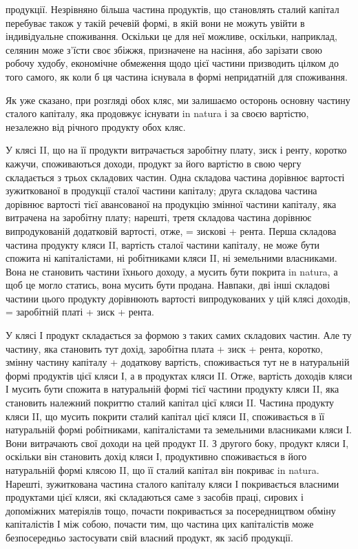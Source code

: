 \parcont{}  %
продукції. Незрівняно більша частина продуктів, що становлять сталий капітал
перебуває також у такій речевій формі, в якій вони не можуть увійти
в індивідуальне споживання. Оскільки це для неї можливе, оскільки, наприклад,
селянин може з’їсти своє збіжжя, призначене на насіння, або зарізати свою робочу
худобу, економічне обмеження щодо цієї частини призводить цілком до того
самого, як коли б ця частина існувала в формі непридатній для споживання.

Як уже сказано, при розгляді обох кляс, ми залишаємо осторонь основну
частину сталого капіталу, яка продовжує існувати in natura і за своєю вартістю,
незалежно від річного продукту обох кляс.

У клясі II, що на її продукти витрачається заробітну плату, зиск і ренту,
коротко кажучи, споживаються доходи, продукт за його вартістю в свою чергу
складається з трьох складових частин. Одна складова частина дорівнює вартості
зужиткованої в продукції сталої частини капіталу; друга складова частина дорівнює
вартості тієї авансованої на продукцію змінної частини капіталу, яка
витрачена на заробітну плату; нарешті, третя складова частина дорівнює випродукованій додатковій
вартості, отже, = зискові + рента. Перша складова частина
продукту кляси II, вартість сталої частини капіталу, не може бути спожита
ні капіталістами, ні робітниками кляси II, ні земельними власниками. Вона не
становить частини їхнього доходу, а мусить бути покрита in natura, а щоб це
могло статись, вона мусить бути продана. Навпаки, дві інші складові частини
цього продукту дорівнюють вартості випродукованих у цій клясі доходів, = заробітній
платі + зиск + рента.

У клясі І продукт складається за формою з таких самих складових частин.
Але ту частину, яка становить тут дохід, заробітна плата + зиск + рента, коротко,
змінну частину капіталу + додаткову вартість, споживається тут не
в натуральній формі продуктів цієї кляси І, а в продуктах кляси II. Отже, вартість
доходів кляси І мусить бути спожита в натуральній формі тієї частини
продукту кляси II, яка становить належний покриттю сталий капітал цієї
кляси II. Частина продукту кляси II, що мусить покрити сталий капітал цієї
кляси II, споживається в її натуральній формі робітниками, капіталістами та
земельними власниками кляси І. Вони витрачають свої доходи на цей продукт II.
З другого боку, продукт кляси І, оскільки він становить дохід кляси І, продуктивно
споживається в його натуральній формі клясою II, що її сталий капітал
він покриває in natura. Нарешті, зужиткована частина сталого капіталу кляси
І покривається власними продуктами цієї кляси, які складаються саме з засобів
праці, сирових і допоміжних матеріялів тощо, почасти покривається за посередництвом
обміну капіталістів І між собою, почасти тим, що частина цих капіталістів
може безпосередньо застосувати свій власний продукт, як засіб продукції.

